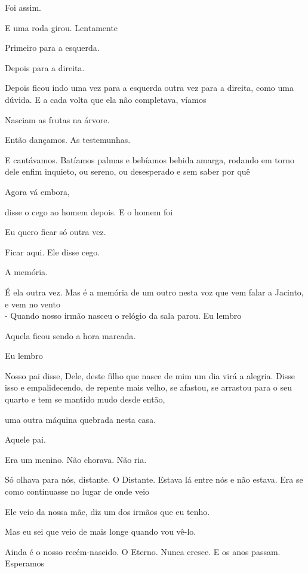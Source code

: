 Foi assim.

E uma roda girou. Lentamente

Primeiro para a esquerda.

Depois para a direita.

Depois ficou indo uma vez para a esquerda outra vez para a direita, como
uma dúvida. E a cada volta que ela não completava, víamos

Nasciam as frutas na árvore.

Então dançamos. As testemunhas.

E cantávamos. Batíamos palmas e bebíamos bebida amarga, rodando em torno
dele enfim inquieto, ou sereno, ou desesperado e sem saber por quê

\pagebreak

Agora vá embora,

disse o cego ao homem depois. E o homem foi

Eu quero ficar só outra vez.

Ficar aqui. Ele disse cego.

\pagebreak

A memória.

É ela outra vez. Mas é a memória de um outro nesta voz que vem falar a
Jacinto,\\

e vem no vento\\

- Quando nosso irmão nasceu o relógio da sala parou. Eu lembro

Aquela ficou sendo a hora marcada.

Eu lembro

Nosso pai disse, Dele, deste filho que nasce de mim um dia virá a
alegria. Disse isso e empalidecendo, de repente mais velho, se afastou,
se arrastou para o seu quarto e tem se mantido mudo desde então,

uma outra máquina quebrada nesta casa.

Aquele pai.

Era um menino. Não chorava. Não ria.

Só olhava para nós, distante. O Distante. Estava lá entre nós e não
estava. Era se como continuasse no lugar de onde veio

Ele veio da nossa mãe, diz um dos irmãos que eu tenho.

Mas eu sei que veio de mais longe quando vou vê-lo.

Ainda é o nosso recém-nascido. O Eterno. Nunca cresce. E os anos passam.
Esperamos

